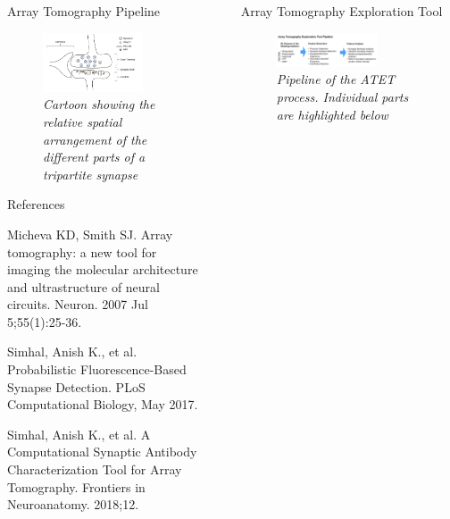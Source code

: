 \documentclass[final, table]{beamer}
\newlength{\sepwid}
\newlength{\onecolwid}
\newlength{\twocolwid}
\begin{document}
\begin{frame}[t]
\begin{columns}[t]
\begin{column}{\onecolwid}
\begin{block}{Array Tomography Pipeline}
\begin{figure}
\centering
\includegraphics[width=0.8\textwidth]{figs/synapsecartoon}
\caption{\textit{Cartoon showing the relative spatial arrangement of the different parts of a tripartite synapse}}
\end{figure}

\end{block} 


\begin{block}{References}
\tiny{
\begin{thebibliography}{99}


Micheva KD, Smith SJ. Array tomography: a new tool for imaging the molecular architecture and ultrastructure of neural circuits. Neuron. 2007 Jul 5;55(1):25-36.

Simhal, Anish K., et al. Probabilistic Fluorescence-Based Synapse Detection. PLoS Computational Biology, May 2017.

Simhal, Anish K., et al. A Computational Synaptic Antibody Characterization Tool for Array Tomography. Frontiers in Neuroanatomy. 2018;12.

\end{thebibliography}}
\end{block}








\end{column}

\begin{column}{\sepwid}\end{column}  %
\begin{column}{\twocolwid}

\begin{block}{Array Tomography Exploration Tool}

\begin{figure}
\centering
\includegraphics[width=0.7\textwidth]{figs/atetpipeline}
\caption{\textit{Pipeline of the ATET process.  Individual parts are highlighted below}}
\end{figure}


\end{block}
\end{column}
\end{columns}
\end{frame}
\end{document}
